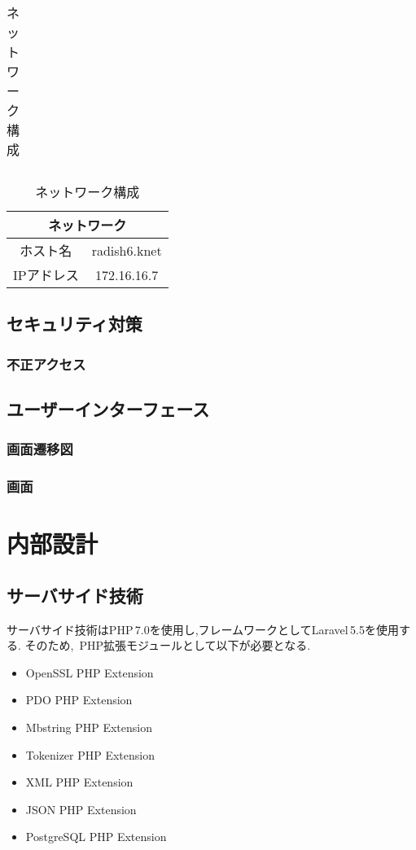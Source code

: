 \documentclass[a4paper]{ltjsarticle}
\begin{document}
\begin{table}[h]
\begin{minipage}[t]{.39\textwidth}
\begin{tabular}{|c||c|}
                \end{tabular}
                \hspace{1\textwidth}
                \caption{ネットワーク構成}
                \label{tab:network}
                \begin{tabular}{|c||c|}
                    \hline
                    \multicolumn{2}{|c|}{ネットワーク} \\ \hline \hline
                    ホスト名 & radish6.knet \\ \hline
                    IPアドレス & 172.16.16.7 \\ \hline
                \end{tabular}
            \end{minipage}
        \end{table}

\subsection{セキュリティ対策}
    \subsubsection{不正アクセス}

\subsection{ユーザーインターフェース}
    \subsubsection{画面遷移図}
    \subsubsection{画面}

\section{内部設計}
    \subsection{サーバサイド技術}
        サーバサイド技術はPHP\,7.0を使用し,フレームワークとしてLaravel\,5.5を使用する.
        そのため,\, PHP拡張モジュールとして以下が必要となる.
        \begin{itemize}
            \item OpenSSL PHP Extension
            \item PDO PHP Extension
            \item Mbstring PHP Extension
            \item Tokenizer PHP Extension
            \item XML PHP Extension
            \item JSON PHP Extension
            \item PostgreSQL PHP Extension
        \end{itemize}
\end{document}
